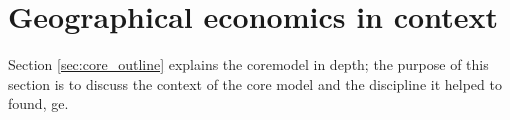 \section{Geographical economics in context \label{sec:GE_context}}

Section \ref{sec:core_outline} explains the \gls{coremodel} in depth; the purpose of this section is to discuss the context of the core model and the discipline it helped to found, \gls{ge}.





